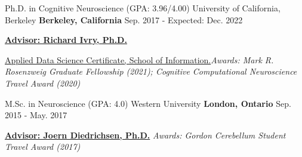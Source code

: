 

\begin{cventries}

  \cventry
    {Ph.D. in Cognitive Neuroscience (GPA: 3.96/4.00)} %
    {University of California, Berkeley} %
    {\textbf{Berkeley, California}} %
    {Sep. 2017 - Expected: Dec. 2022} %
    {
      \begin{cvitems} %
        \item {{\href{http://ivrylab.berkeley.edu/rich-ivry.html}{\textbf{Advisor: Richard Ivry, Ph.D.}}}}
        \item {{\href{https://www.ischool.berkeley.edu/programs/data-science-certificate}{Applied Data Science Certificate, School of Information.}}\textit{Awards: Mark R. Rosenzweig Graduate Fellowship (2021); Cognitive Computational Neuroscience Travel Award (2020)}}
      \end{cvitems}
    }

  \cventry
    {M.Sc. in Neuroscience (GPA: 4.0)} %
    {Western University} %
    {\textbf{London, Ontario}} %
    {Sep. 2015 - May. 2017} %
    {
      \begin{cvitems} %
        \item {{\href{http://www.diedrichsenlab.org/}{\textbf{Advisor: Joern Diedrichsen, Ph.D.}}} \textit{Awards: Gordon Cerebellum Student Travel Award (2017)}}
      \end{cvitems}
    }
    

\end{cventries}
